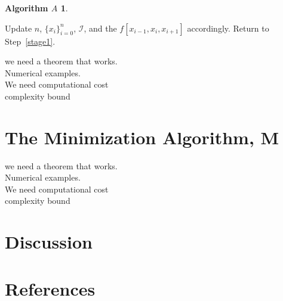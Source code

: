 \documentclass[review]{elsarticle}
\theoremstyle{definition}
\newtheorem*{algoA}{Algorithm $A$}
\begin{document}
\begin{algoA}
\begin{enumerate}[\hspace{8.5ex}]
Update $n$, $\{x_i\}_{i=0}^n$, $\mathcal{I}$, and the $f[x_{i-1}, x_{i}, x_{i+1}]$ accordingly.  Return to Step~\ref{stage1}.

\end{enumerate}
\end{algoA}

we need a theorem that works.\\
Numerical examples.\\
We need computational cost\\
complexity bound \\

\section{The Minimization Algorithm, M}

we need a theorem that works.\\
Numerical examples.\\
We need computational cost\\
complexity bound \\

\section{Discussion}

\section*{References}


\end{document}
